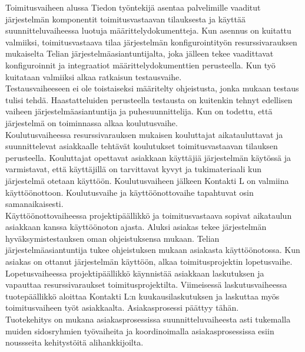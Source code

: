 \documentclass[finnish,12pt,a4paper,pdftex]{article}
\begin{document}
Toimitusvaiheen alussa Tiedon työntekijä asentaa palvelimille vaaditut järjestelmän komponentit toimitusvastaavan tilauksesta ja käyttää suunnitteluvaiheessa luotuja määrittelydokumentteja. Kun asennus on kuitattu valmiiksi, toimitusvastaava tilaa järjestelmän konfigurointityön resurssivarauksen mukaiselta Telian järjestelmäasiantuntijalta, joka jälleen tekee vaadittavat konfiguroinnit ja integraatiot määrittelydokumenttien perusteella. Kun työ kuitataan valmiiksi alkaa ratkaisun testausvaihe.\\

Testausvaiheeseen ei ole toistaiseksi määritelty ohjeistusta, jonka mukaan testaus tulisi tehdä. Haastatteluiden perusteella testausta on kuitenkin tehnyt edellisen vaiheen järjestelmäasiantuntija ja puhesuunnittelija. Kun on todettu, että järjestelmä on toiminnassa alkaa koulutusvaihe.\\

Koulutusvaiheessa resurssivarauksen mukaisen kouluttajat aikatauluttavat ja suunnittelevat asiakkaalle tehtävät koulutukset toimitusvastaavan tilauksen perusteella. Kouluttajat opettavat asiakkaan käyttäjiä järjestelmän käytössä ja varmistavat, että käyttäjillä on tarvittavat kyvyt ja tukimateriaali kun järjestelmä otetaan käyttöön. Koulutusvaiheen jälkeen Kontakti L on valmiina käyttöönottoon. Koulutusvaihe ja käyttöönottovaihe tapahtuvat osin samanaikaisesti.\\

Käyttöönottovaiheessa projektipäällikkö ja toimitusvastaava sopivat aikataulun asiakkaan kanssa käyttöönoton ajasta. Aluksi asiakas tekee järjestelmän hyväksymistestauksen oman ohjeistuksensa mukaan. Telian järjestelmäasiantuntija tukee ohjeistuksen mukaan asiakasta käyttöönotossa. Kun asiakas on ottanut järjestelmän käyttöön, alkaa toimitusprojektin lopetusvaihe.\\

Lopetusvaiheessa projektipäällikkö käynnistää asiakkaan laskutuksen ja vapauttaa resurssivaraukset toimitusprojektilta. Viimeisessä laskutusvaiheessa tuotepäällikkö aloittaa Kontakti L:n kuukausilaskutuksen ja laskuttaa myös toimitusvaiheen työt asiakkaalta. Asiakasprosessi päättyy tähän.\\

Tuotekehitys on mukana asiakasprosessissa suunnitteluvaiheesta asti tukemalla muiden sidosryhmien työvaiheita ja koordinoimalla asiakasprosessissa esiin noussseita kehitystöitä alihankkijoilta.

 
\end{document}
